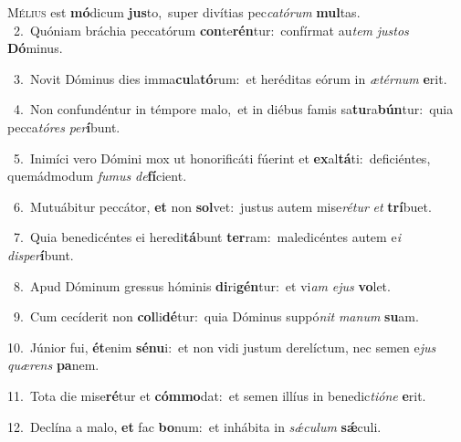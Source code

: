 \lettrine{\initial\textcolor{\initialcolor}{M}}{élius} est \textbf{mó}\-dicum \textbf{jus}\-to,~\star super divítias pec\-\textit{ca}\-\textit{tó}\textit{rum} \textbf{mul}\-tas.\\
{\numbfont\textcolor{\numbcolor}{~2.}}~Quóniam bráchia peccatórum \textbf{con}\-te\-\textbf{rén}\-tur:~\star confírmat au\textit{tem} \textit{jus}\-\textit{tos} \textbf{Dó}\-minus.\par
{\numbfont\textcolor{\numbcolor}{~3.}}~Novit Dóminus dies imma\-\textbf{cu}\-la\-\textbf{tó}\-rum:~\star et heréditas eórum in \textit{æ}\-\textit{tér}\textit{num} \textbf{e}\-rit.\par
{\numbfont\textcolor{\numbcolor}{~4.}}~Non confundéntur in témpore malo,~\dagger et in diébus famis sa\-\textbf{tu}\-ra\-\textbf{bún}\-tur:~\star quia pecca\-\textit{tó}\-\textit{res} \textit{per}\-\textbf{í}bunt.\par
{\numbfont\textcolor{\numbcolor}{~5.}}~Inimíci vero Dómini mox ut honorificáti fúerint et \textbf{ex}\-al\-\textbf{tá}\-ti:~\star deficiéntes, quemádmodum \textit{fu}\-\textit{mus} \textit{de}\-\textbf{fí}cient.\par
{\numbfont\textcolor{\numbcolor}{~6.}}~Mutuábitur peccátor, \textbf{et} non \textbf{sol}\-vet:~\star justus autem mise\-\textit{ré}\-\textit{tur} \textit{et} \textbf{trí}\-buet.\par
{\numbfont\textcolor{\numbcolor}{~7.}}~Quia benedicéntes ei heredi\-\textbf{tá}\-bunt \textbf{ter}\-ram:~\star maledicéntes autem e\textit{i} \textit{dis}\-\textit{per}\textbf{í}bunt.\par
{\numbfont\textcolor{\numbcolor}{~8.}}~Apud Dóminum gressus hóminis \textbf{di}\-ri\-\textbf{gén}\-tur:~\star et vi\textit{am} \textit{e}\-\textit{jus} \textbf{vo}\-let.\par
{\numbfont\textcolor{\numbcolor}{~9.}}~Cum cecíderit non \textbf{col}\-li\-\textbf{dé}\-tur:~\star quia Dóminus suppó\textit{nit} \textit{ma}\-\textit{num} \textbf{su}\-am.\par
{\numbfont\textcolor{\numbcolor}{10.}}~Júnior fui, \textbf{ét}\-enim \textbf{sé}\-\textbf{nu}i:~\star et non vidi justum derelíctum, nec semen e\textit{jus} \textit{quæ}\-\textit{rens} \textbf{pa}\-nem.\par
{\numbfont\textcolor{\numbcolor}{11.}}~Tota die mise\-\textbf{ré}\-tur et \textbf{cóm}\-\textbf{mo}dat:~\star et semen illíus in benedic\-\textit{ti}\-\textit{ó}\textit{ne} \textbf{e}\-rit.\par
{\numbfont\textcolor{\numbcolor}{12.}}~Declína a malo, \textbf{et} fac \textbf{bo}\-num:~\star et inhábita in \textit{sǽ}\-\textit{cu}\textit{lum} \textbf{sǽ}\-culi.\par
